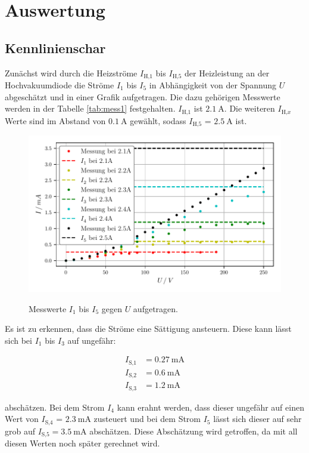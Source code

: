 \newpage
\section{Auswertung}
\subsection{Kennlinienschar}
Zunächst wird durch die Heizströme $I_{\text{H,}1}$ bis $I_{\text{H,}5}$ der Heizleistung an der Hochvakuumdiode die Ströme $I_1$ bis $I_5$ in Abhängigkeit von der Spannung $U$ abgeschätzt und 
in einer Grafik aufgetragen. Die dazu gehörigen Messwerte werden in der Tabelle \ref{tab:mess1} festgehalten. $I_{\text{H,}1}$ ist $\SI{2.1}{\ampere}$. Die weiteren $I_{\text{H,}x}$ Werte sind im Abstand von 
$\SI{0.1}{\ampere}$ gewählt, sodass $I_{\text{H,}5}$ = $\SI{2.5}{\ampere}$ ist.

\begin{figure}
    \centering
    \includegraphics[width=\textwidth]{Daten/kennlinie.pdf}
    \label{fig:kennlinie}
    \caption{Messwerte $I_1$ bis $I_5$ gegen $U$ aufgetragen.}
\end{figure}

Es ist zu erkennen, dass die Ströme eine Sättigung ansteuern. Diese kann lässt sich bei $I_{1}$ bis $I_{3}$ auf ungefähr:

\begin{align*}
    I_\text{S,1} &= \SI{0.27 }{\milli\ampere} \\
    I_\text{S,2} &= \SI{0.6}{\milli\ampere} \\
    I_\text{S,3} &= \SI{1.2}{\milli\ampere}
  \end{align*}

  abschätzen. Bei dem Strom $I_{4}$ kann erahnt werden, dass dieser ungefähr auf einen Wert von $I_\text{S,4}$ = $\SI{2.3}{\milli\ampere}$ zusteuert 
  und bei dem Strom $I_{5}$ lässt sich dieser auf sehr grob auf $I_\text{S,5} = \SI{3.5}{\milli\ampere}$ abschätzen. Diese Abschätzung wird getroffen, da mit all diesen Werten noch später gerechnet wird.


